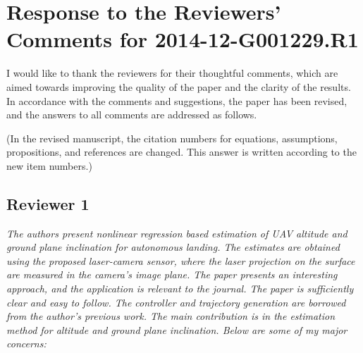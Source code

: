 \documentclass[11pt]{article}
\begin{document}

\section*{Response to the Reviewers' Comments for 2014-12-G001229.R1}

I would like to thank the reviewers for their thoughtful comments, which are aimed
towards improving the quality of the paper and the clarity of the results. In accordance with the comments and suggestions, the paper has been revised, and the answers to all comments are addressed as follows.

(In the revised manuscript, the citation numbers for equations, assumptions, propositions, and references are changed. This answer is written according to the new item numbers.)

\subsection*{Reviewer 1}

\textit{The authors present nonlinear regression based estimation of UAV altitude and ground plane inclination for autonomous landing. 
The estimates are obtained using the proposed laser-camera sensor, where the laser projection on the surface are measured in the camera's image plane. 
The paper presents an interesting approach, and the application is relevant to the journal. 
The paper is sufficiently clear and easy to follow. 
The controller and trajectory generation are borrowed from the author's previous work. 
The main contribution is in the estimation method for altitude and ground plane inclination. Below are some of my major concerns:
}
\end{document}
